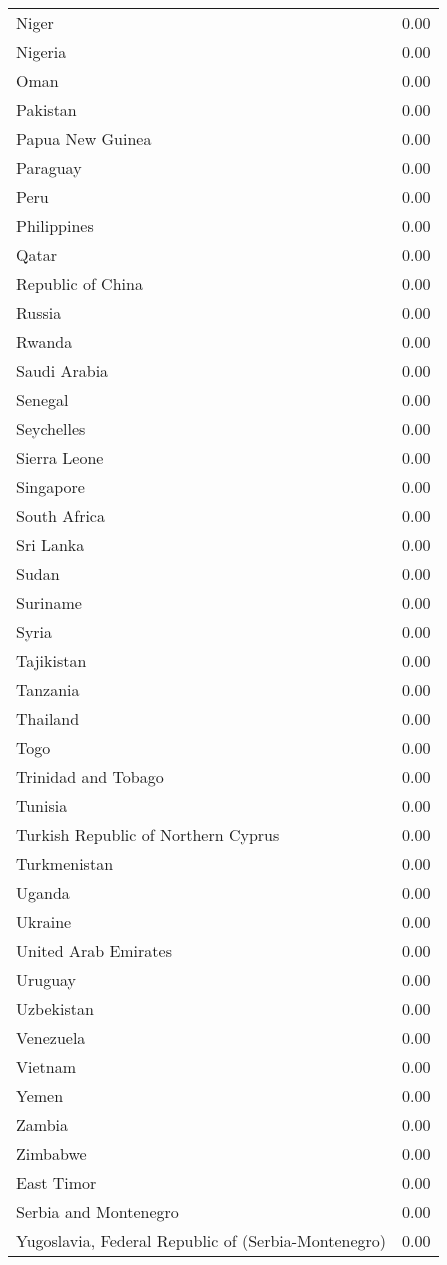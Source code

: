 \begin{table}[ht]
\begin{tabular}{lr}
  Niger & 0.00 \\ 
  Nigeria & 0.00 \\ 
  Oman & 0.00 \\ 
  Pakistan & 0.00 \\ 
  Papua New Guinea & 0.00 \\ 
  Paraguay & 0.00 \\ 
  Peru & 0.00 \\ 
  Philippines & 0.00 \\ 
  Qatar & 0.00 \\ 
  Republic of China & 0.00 \\ 
  Russia & 0.00 \\ 
  Rwanda & 0.00 \\ 
  Saudi Arabia & 0.00 \\ 
  Senegal & 0.00 \\ 
  Seychelles & 0.00 \\ 
  Sierra Leone & 0.00 \\ 
  Singapore & 0.00 \\ 
  South Africa & 0.00 \\ 
  Sri Lanka & 0.00 \\ 
  Sudan & 0.00 \\ 
  Suriname & 0.00 \\ 
  Syria & 0.00 \\ 
  Tajikistan & 0.00 \\ 
  Tanzania & 0.00 \\ 
  Thailand & 0.00 \\ 
  Togo & 0.00 \\ 
  Trinidad and Tobago & 0.00 \\ 
  Tunisia & 0.00 \\ 
  Turkish Republic of Northern Cyprus & 0.00 \\ 
  Turkmenistan & 0.00 \\ 
  Uganda & 0.00 \\ 
  Ukraine & 0.00 \\ 
  United Arab Emirates & 0.00 \\ 
  Uruguay & 0.00 \\ 
  Uzbekistan & 0.00 \\ 
  Venezuela & 0.00 \\ 
  Vietnam & 0.00 \\ 
  Yemen & 0.00 \\ 
  Zambia & 0.00 \\ 
  Zimbabwe & 0.00 \\ 
  East Timor & 0.00 \\ 
  Serbia and Montenegro & 0.00 \\ 
  Yugoslavia, Federal Republic of (Serbia-Montenegro) & 0.00 \\ 
   \hline
\end{tabular}
\end{table}

